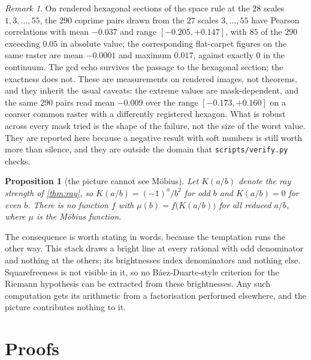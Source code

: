 \documentclass[11pt]{amsart}
\newtheorem{proposition}[theorem]{Proposition}
\theoremstyle{definition}
\theoremstyle{remark}
\newtheorem{remark}[theorem]{Remark}
\begin{document}
\begin{remark}
\label{rem:hex}
On rendered hexagonal sections of the space rule at the $28$ scales $1,3,\dots,55$, the $290$ coprime pairs drawn from the $27$ scales $3,\dots,55$ have Pearson correlations with mean $-0.037$ and range $[-0.205,+0.147]$, with $85$ of the $290$ exceeding $0.05$ in absolute value; the corresponding flat-carpet figures on the same raster are mean $-0.0001$ and maximum $0.017$, against exactly $0$ in the continuum. The gcd echo survives the passage to the hexagonal section; the exactness does not. These are measurements on rendered images, not theorems, and they inherit the usual caveats: the extreme values are mask-dependent, and the same $290$ pairs read mean $-0.009$ over the range $[-0.173,+0.160]$ on a coarser common raster with a differently registered hexagon. What is robust across every mask tried is the shape of the failure, not the size of the worst value. They are reported here because a negative result with soft numbers is still worth more than silence, and they are outside the domain that \texttt{scripts/verify.py} checks.
\end{remark}

\begin{proposition}[the picture cannot see M\"obius]
\label{prop:brightness}
Let $K(a/b)$ denote the ray strength of \cref{thm:ray}, so $K(a/b)=(-1)^a/b^2$ for odd $b$ and $K(a/b)=0$ for even $b$. There is no function $f$ with $\mu(b)=f\bigl(K(a/b)\bigr)$ for all reduced $a/b$, where $\mu$ is the M\"obius function.
\end{proposition}

The consequence is worth stating in words, because the temptation runs the other way. This stack draws a bright line at every rational with odd denominator and nothing at the others; its brightnesses index denominators and nothing else. Squarefreeness is not visible in it, so no B\'aez-Duarte-style criterion for the Riemann hypothesis \cite{baezduarte} can be extracted from these brightnesses. Any such computation gets its arithmetic from a factorisation performed elsewhere, and the picture contributes nothing to it.

\section{Proofs}
\label{sec:proofs}
\end{document}
